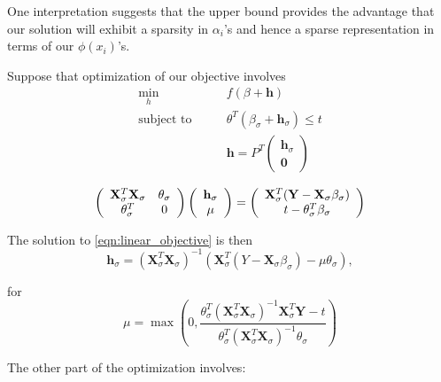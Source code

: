 \documentclass{article}
\renewcommand{\vec}[1]{\mathbf{#1}}
\begin{document}
One interpretation suggests that the upper bound provides the advantage that our solution will exhibit a sparsity in $\alpha_i$'s and hence a sparse representation in terms of our $\phi(x_i)$'s.

Suppose that optimization of our objective involves
\begin{align*} \label{eqn:linear_objective}
\min_h \qquad & f(\beta + \vec{h}) \\
\text{subject to} \qquad & \theta^T (\beta_\sigma + \vec{h}_\sigma) \leq t \\
& \vec{h} = P^T
\left( \begin{array}{c}
  \vec{h}_\sigma \\
  \vec{0}
\end{array} \right)
\end{align*}

\begin{equation} \label{eqn:KKT}
\left( \begin{array}{c c}
\vec{X}^T_\sigma \vec{X}_\sigma & \theta_\sigma \\
\theta_\sigma^T & 0
\end{array} \right)
\left( \begin{array}{c}
\vec{h}_\sigma \\
\mu
\end{array} \right)
=
\left( \begin{array}{c}
\vec{X}_\sigma^T (\vec{Y} - \vec{X}_\sigma \beta_\sigma) \\
t - \theta_\sigma^T \beta_\sigma
\end{array} \right)
\end{equation}


The solution to \eqref{eqn:linear_objective} is then
\begin{equation}
\vec{h}_\sigma = (\vec{X}_\sigma^T \vec{X}_\sigma)^{-1} (\vec{X}_\sigma^T (Y - \vec{X}_\sigma \beta_\sigma) - \mu \theta_\sigma),
\end{equation}

for
\[
\mu = \max \left( 0, \frac{\theta_\sigma^T (\vec{X}_\sigma^T \vec{X}_\sigma)^{-1} \vec{X}_\sigma^T \vec{Y} - t}{\theta_\sigma^T (\vec{X}_\sigma^T \vec{X}_\sigma)^{-1} \theta_\sigma} \right)
\]


The other part of the optimization involves:
\end{document}
